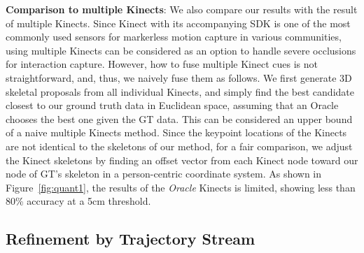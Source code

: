 \textbf{Comparison to multiple Kinects}: We also compare our results with the result of multiple Kinects. Since Kinect with its accompanying SDK is one of the most commonly used sensors for markerless motion capture in various communities, using multiple Kinects can be considered as an option to handle severe occlusions for interaction capture. However, how to fuse multiple Kinect cues is not straightforward, and, thus, we naively fuse them as follows. We first generate 3D skeletal proposals from all individual Kinects, and simply find the best candidate closest to our ground truth data in Euclidean space, assuming that an Oracle chooses the best one given the GT data. This can be considered an upper bound of a naive multiple Kinects method. Since the keypoint locations of the Kinects are not identical to the skeletons of our method, for a fair comparison, we adjust the Kinect skeletons by finding an offset vector from each Kinect node toward our node of GT's skeleton in a person-centric coordinate system. As shown in Figure~\ref{fig:quant1}, the results of the \emph{Oracle} Kinects is limited, showing less than 80\% accuracy at a 5cm threshold. %

\subsection{Refinement by Trajectory Stream}

